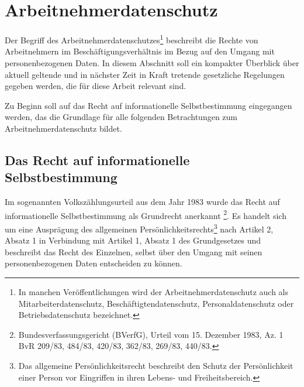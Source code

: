 \section{Arbeitnehmerdatenschutz}
\label{sec_basics_employee_privacy}

Der Begriff des Arbeitnehmerdatenschutzes\footnote{
  In manchen Veröffentlichungen wird der Arbeitnehmerdatenschutz auch als Mitarbeiterdatenschutz, Beschäftigtendatenschutz, Personaldatenschutz oder Betriebsdatenschutz bezeichnet.
}
beschreibt die Rechte von Arbeitnehmern im Beschäftigungsverhältnis im Bezug auf den Umgang mit personenbezogenen Daten. In diesem Abschnitt soll ein kompakter Überblick über aktuell geltende und in nächster Zeit in Kraft tretende gesetzliche Regelungen gegeben werden, die für diese Arbeit relevant sind.

Zu Beginn soll auf das Recht auf informationelle Selbstbestimmung eingegangen werden, das die Grundlage für alle folgenden Betrachtungen zum Arbeitnehmerdatenschutz bildet.

\subsection{Das Recht auf informationelle Selbstbestimmung}

Im sogenannten Volkszählungsurteil aus dem Jahr 1983 wurde das Recht auf informationelle Selbstbestimmung als Grundrecht anerkannt \footnote{
  Bundesverfassungsgericht (BVerfG), Urteil vom 15. Dezember 1983, Az. 1 BvR 209/83, 484/83, 420/83, 362/83, 269/83, 440/83.
}. 
Es handelt sich um eine Ausprägung des allgemeinen Persönlichkeitsrechts\footnote{
  Das allgemeine Persönlichkeitsrecht beschreibt den Schutz der Persönlichkeit einer Person vor Eingriffen in ihren Lebens- und Freiheitsbereich.
} nach Artikel 2, Absatz 1 in Verbindung mit Artikel 1, Absatz 1 des Grundgesetzes und beschreibt das Recht des Einzelnen, selbst über den Umgang mit seinen personenbezogenen Daten entscheiden zu können. 

%    
%    
%        
    
